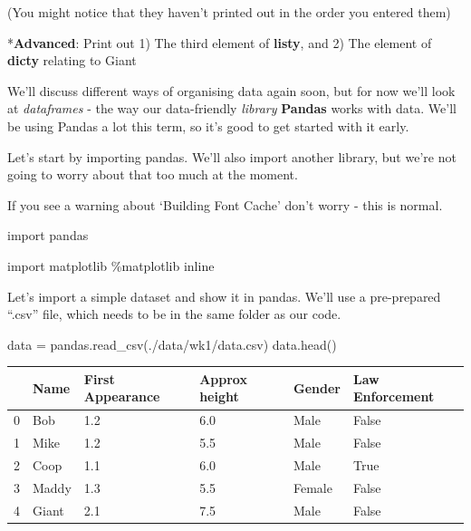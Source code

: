 \documentclass[
  letterpaper,
  DIV=11,
  numbers=noendperiod]{scrreprt}
\newenvironment{Shaded}{\begin{snugshade}}{\end{snugshade}}
\newcommand{\ImportTok}[1]{\textcolor[rgb]{0.00,0.46,0.62}{#1}}
\newcommand{\NormalTok}[1]{\textcolor[rgb]{0.00,0.23,0.31}{#1}}
\newcommand{\OperatorTok}[1]{\textcolor[rgb]{0.37,0.37,0.37}{#1}}
\newcommand{\StringTok}[1]{\textcolor[rgb]{0.13,0.47,0.30}{#1}}
\begin{document}
(You might notice that they haven't printed out in the order you entered
them)

*\textbf{Advanced}: Print out 1) The third element of \textbf{listy},
and 2) The element of \textbf{dicty} relating to Giant

We'll discuss different ways of organising data again soon, but for now
we'll look at \emph{dataframes} - the way our data-friendly
\emph{library} \textbf{Pandas} works with data. We'll be using Pandas a
lot this term, so it's good to get started with it early.

Let's start by importing pandas. We'll also import another library, but
we're not going to worry about that too much at the moment.

If you see a warning about `Building Font Cache' don't worry - this is
normal.

\begin{Shaded}
\begin{Highlighting}[]
\ImportTok{import}\NormalTok{ pandas}

\ImportTok{import}\NormalTok{ matplotlib}
\OperatorTok{\%}\NormalTok{matplotlib inline}
\end{Highlighting}
\end{Shaded}

Let's import a simple dataset and show it in pandas. We'll use a
pre-prepared ``.csv'' file, which needs to be in the same folder as our
code.

\begin{Shaded}
\begin{Highlighting}[]
\NormalTok{data }\OperatorTok{=}\NormalTok{ pandas.read\_csv(}\StringTok{\textquotesingle{}./data/wk1/data.csv\textquotesingle{}}\NormalTok{)}
\NormalTok{data.head()}
\end{Highlighting}
\end{Shaded}

\begin{longtable}[]{@{}llllll@{}}
\toprule()
& Name & First Appearance & Approx height & Gender & Law Enforcement \\
\midrule()
\endhead
0 & Bob & 1.2 & 6.0 & Male & False \\
1 & Mike & 1.2 & 5.5 & Male & False \\
2 & Coop & 1.1 & 6.0 & Male & True \\
3 & Maddy & 1.3 & 5.5 & Female & False \\
4 & Giant & 2.1 & 7.5 & Male & False \\
\bottomrule()
\end{longtable}
\end{document}

